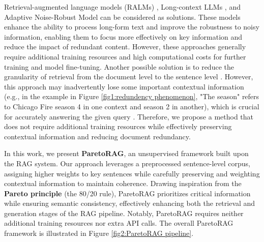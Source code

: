 Retrieval-augmented language models (RALMs) \cite{zhang2024raft, lin2024radit}, Long-context LLMs \cite{dubey2024llama, team2024gemini}, and Adaptive Noise-Robust Model \cite{yoran2024making, fangEnhancingNoiseRobustness2024a} can be considered as solutions. These models enhance the ability to process long-form text and improve the robustness to noisy information, enabling them to focus more effectively on key information and reduce the impact of redundant content. However, these approaches generally require additional training resources and high computational costs for further training and model fine-tuning. Another possible solution is to reduce the granularity of retrieval from the document level to the sentence level \cite{leePhraseRetrievalLearns2021, chenDenseRetrievalWhat2024a}. However, this approach may inadvertently lose some important contextual information (e.g., in the example in Figure \ref{fig1:redundency phenomenon}, "The season" refers to Chicago Fire season 4 in one context and season 2 in another), which is crucial for accurately answering the given query \cite{choiDecontextualizationMakingSentences2021}. Therefore, we propose a method that does not require additional training resources while effectively preserving contextual information and reducing document redundancy.

In this work, we present \textbf{ParetoRAG}, an unsupervised framework built upon the RAG system. Our approach leverages a preprocessed sentence-level corpus, assigning higher weights to key sentences while carefully preserving and weighting contextual information to maintain coherence. Drawing inspiration from the \textbf{Pareto principle} (the 80/20 rule), ParetoRAG prioritizes critical information while ensuring semantic consistency, effectively enhancing both the retrieval and generation stages of the RAG pipeline. Notably, ParetoRAG requires neither additional training resources nor extra API
calls. The overall ParetoRAG framework is illustrated in Figure \ref{fig2:ParetoRAG pipeline}. 

